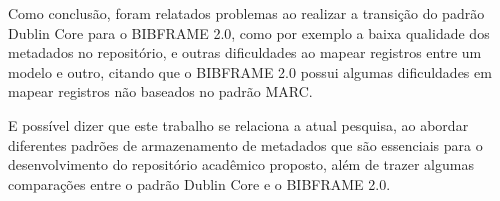 Como conclusão, foram relatados problemas ao realizar a transição do
padrão Dublin Core para o BIBFRAME 2.0, como por exemplo a baixa
qualidade dos metadados no repositório, e outras dificuldades ao
mapear registros entre um modelo e outro, citando que o BIBFRAME 2.0
possui algumas dificuldades em mapear registros não baseados no padrão
MARC.

E possível dizer que este trabalho se relaciona a atual pesquisa, ao
abordar diferentes padrões de armazenamento de metadados que são essenciais
para o desenvolvimento do repositório acadêmico proposto, além de trazer
algumas comparações entre o padrão Dublin Core e o BIBFRAME 2.0.



\pagebreak

\begin{landscape}
    \begin{table}[H]
        \captionsetup{justification=centering}
        \caption{Trabalhos Relacionados}
        \centering
\end{table}
\end{landscape}
